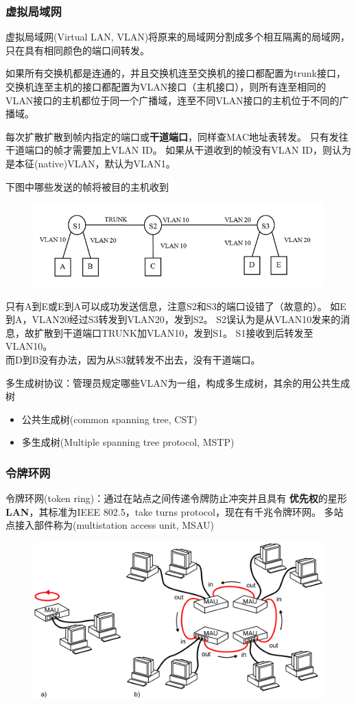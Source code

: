 \subsubsection{虚拟局域网}
虚拟局域网(Virtual LAN, VLAN)将原来的局域网分割成多个相互隔离的局域网，只在具有相同颜色的端口间转发。

如果所有交换机都是连通的，并且交换机连至交换机的接口都配置为trunk接口，交换机连至主机的接口都配置为VLAN接口（主机接口），则所有连至相同的VLAN接口的主机都位于同一个广播域，连至不同VLAN接口的主机位于不同的广播域。

每次扩散扩散到帧内指定的端口或\textbf{干道端口}，同样查MAC地址表转发。
只有发往干道端口的帧才需要加上VLAN ID。
如果从干道收到的帧没有VLAN ID，则认为是本征(native)VLAN，默认为VLAN1。
\begin{example}
	下图中哪些发送的帧将被目的主机收到
	\begin{figure}[H]
		\centering
		\includegraphics[width=0.5\linewidth]{fig/vlan.jpg}
	\end{figure}
\end{example}
\begin{analysis}
	只有A到E或E到A可以成功发送信息，注意S2和S3的端口设错了（故意的）。
	如E到A，VLAN20经过S3转发到VLAN20，发到S2。
	S2误认为是从VLAN10发来的消息，故扩散到干道端口TRUNK加VLAN10，发到S1。
	S1接收到后转发至VLAN10。\\
	而D到B没有办法，因为从S3就转发不出去，没有干道端口。
\end{analysis}

多生成树协议：管理员规定哪些VLAN为一组，构成多生成树，其余的用公共生成树
\begin{itemize}
	\item 公共生成树(common spanning tree, CST)
	\item 多生成树(Multiple spanning tree protocol, MSTP)
\end{itemize}

\subsubsection{令牌环网}
令牌环网(token ring)：通过在站点之间传递令牌防止冲突并且具有
\textbf{优先权}的星形\textbf{LAN}，其标准为IEEE 802.5，take turns protocol，现在有千兆令牌环网。
多站点接入部件称为(multistation access unit, MSAU)
\begin{figure}[H]
	\centering
	\includegraphics[width=0.5\linewidth]{fig/token-ring.png}
\end{figure}

